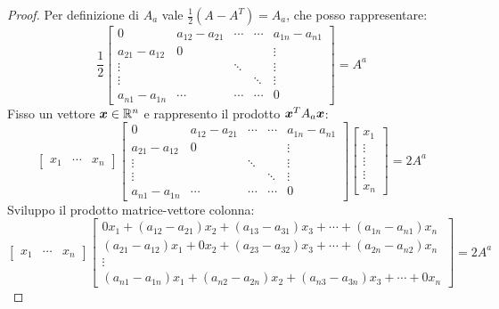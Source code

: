 \begin{proof}
Per definizione di $A_{a}$ vale $\frac{1}{2}(A - A^{T}) = A_{a}$, che posso
rappresentare:
\begin{displaymath}
\frac{1}{2} 
\begin{bmatrix}
0 & a_{12} - a_{21} & \cdots &\cdots & a_{1n} - a_{n1} \\
a_{21} - a_{12} & 0 &		&		& \vdots\\
\vdots &  		& \ddots & 		& \vdots\\
\vdots & 		&		& \ddots & \vdots\\
a_{n1} - a_{1n}& \cdots & \cdots &\cdots & 0
\end{bmatrix} = A^{a}
\end{displaymath}
Fisso un vettore $\boldsymbol{x} \in \mathbb{R}^{n}$ e rappresento il prodotto
$\boldsymbol{x}^{T}A_{a}\boldsymbol{x}$:
\begin{displaymath}
\begin{bmatrix}
x_{1} & \cdots & x_{n}
\end{bmatrix}
\begin{bmatrix}
0 & a_{12} - a_{21} & \cdots &\cdots & a_{1n} - a_{n1} \\
a_{21} - a_{12} & 0 &		&		& \vdots\\
\vdots &  		& \ddots & 		& \vdots\\
\vdots & 		&		& \ddots & \vdots\\
a_{n1} - a_{1n}& \cdots & \cdots &\cdots & 0
\end{bmatrix} 
\begin{bmatrix}
x_{1} \\ 
\vdots \\ 
\vdots \\
\vdots \\
x_{n}
\end{bmatrix}= 2 A^{a}
\end{displaymath}
Sviluppo il prodotto matrice-vettore colonna:
\begin{displaymath}
\begin{bmatrix}
x_{1} & \cdots & x_{n}
\end{bmatrix}
\begin{bmatrix}
0x_{1} + (a_{12} - a_{21})x_{2} + (a_{13} - a_{31})x_{3} + \cdots + (a_{1n} -
a_{n1})x_{n} \\ 
(a_{21} - a_{12})x_{1} + 0x_{2} + (a_{23} - a_{32})x_{3} + \cdots + (a_{2n} -
a_{n2})x_{n} \\ 
\vdots\\
(a_{n1} - a_{1n})x_{1} + (a_{n2} - a_{2n})x_{2} + (a_{n3} - a_{3n})x_{3} +
\cdots + 0x_{n}
\end{bmatrix} = 2 A^{a}

\end{displaymath}
\end{proof}
